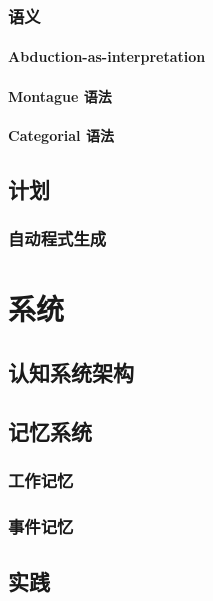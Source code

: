 \documentclass[12pt,a4paper]{report}
\newcommand{\cc}[2]{#1}
\newcommand{\cc}[2]{#2}
\theoremstyle{examples} \newtheorem{example}{Example}[section]
\begin{document}
	\section{\cc{语义}{Semantic theory}}
		\subsection{\cc{Abduction-as-interpretation}{Abduction as interpretation}}
		\subsection{\cc{Montague 语法}{Montague grammar}}
		\subsection{\cc{Categorial 语法}{Categorial grammar}}

\chapter{\cc{计划}{Planning}}

	\section{\cc{自动程式生成}{Program synthesis}}

\part{\cc{系统}{Architecture}}

\chapter{\cc{认知系统架构}{Cognitive architectures}}

\chapter{\cc{记忆系统}{Memory systems}}

	\section{\cc{工作记忆}{Working memory}}
	
	\section{\cc{事件记忆}{Episodic memory}}
	
\chapter{\cc{实践}{Implementation}}
\end{document}
